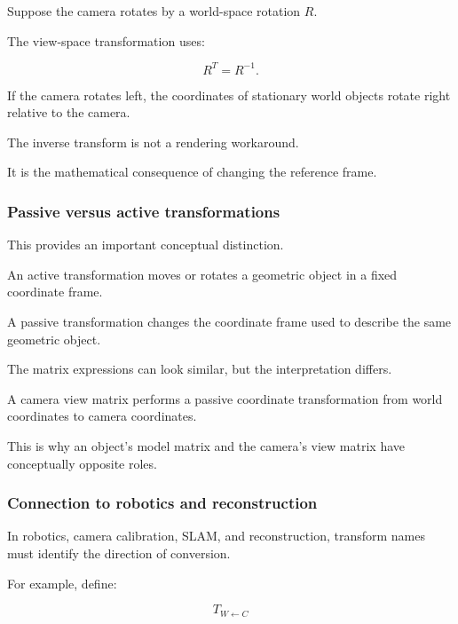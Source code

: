 \hypertarget{02-foundations-ii-ch032-rotation-behaves-similarly}{}

Suppose the camera rotates by a world-space rotation \(R\).

The view-space transformation uses:

\[
 R^T=R^{-1}.
\]

If the camera rotates left, the coordinates of stationary world objects rotate right relative to the camera.

The inverse transform is not a rendering workaround.

It is the mathematical consequence of changing the reference frame.

\subsubsection{Passive versus active transformations}\label{02-foundations-ii-ch032-passive-versus-active-transformations}

\hypertarget{02-foundations-ii-ch032-passive-versus-active-transformations}{}

This provides an important conceptual distinction.

An active transformation moves or rotates a geometric object in a fixed coordinate frame.

A passive transformation changes the coordinate frame used to describe the same geometric object.

The matrix expressions can look similar, but the interpretation differs.

A camera view matrix performs a passive coordinate transformation from world coordinates to camera coordinates.

This is why an object's model matrix and the camera's view matrix have conceptually opposite roles.

\subsubsection{Connection to robotics and reconstruction}\label{02-foundations-ii-ch032-connection-to-robotics-and-reconstruction}

\hypertarget{02-foundations-ii-ch032-connection-to-robotics-and-reconstruction}{}

In robotics, camera calibration, SLAM, and reconstruction, transform names must identify the direction of conversion.

For example, define:

\[
 T_{W\leftarrow C}
\]

